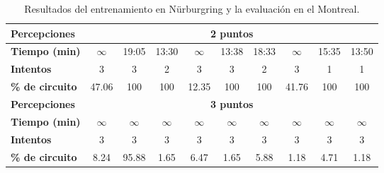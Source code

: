 \begin{table}[ht!]
\begin{tabular}{|l|c|c|c|c|c|c|c|c|c|}
\rowcolor[HTML]{EFEFEF} 
\textbf{Percepciones}                           & \multicolumn{9}{c|}{\cellcolor[HTML]{EFEFEF}\textbf{2 puntos}}                                                                                                                                                        \\ \hline
\rowcolor[HTML]{FFFFFF} 
\cellcolor[HTML]{EFEFEF}\textbf{Tiempo (min)}            & $\infty$                         & 19:05        & 13:30       & $\infty$                       & 13:38                        & 18:33      & $\infty$                       & 15:35                         & 13:50      \\ \hline
\rowcolor[HTML]{FFFFFF} 
\cellcolor[HTML]{EFEFEF}\textbf{Intentos}                & 3                               & 3            & 2           & 3                             & 3                            & 2          & 3                             & 1                             & 1          \\ \hline
\rowcolor[HTML]{32CB00} 
\cellcolor[HTML]{EFEFEF}\textbf{\% de circuito}          & \cellcolor[HTML]{FFC702}47.06   & 100          & 100         & \cellcolor[HTML]{FFC702}12.35 & 100                          & 100        & \cellcolor[HTML]{FFC702}41.76 & 100                           & 100        \\ \hline
\rowcolor[HTML]{EFEFEF} 
\textbf{Percepciones}                                    & \multicolumn{9}{c|}{\cellcolor[HTML]{EFEFEF}\textbf{3 puntos}}                                                                                                                                                        \\ \hline
\cellcolor[HTML]{EFEFEF}\textbf{Tiempo (min)}   & $\infty$                         & $\infty$      & $\infty$     & $\infty$                       & $\infty$                      & $\infty$    & $\infty$                       & $\infty$                       & $\infty$    \\ \hline
\cellcolor[HTML]{EFEFEF}\textbf{Intentos}       & 3                               & 3            & 3           & 3                             & 3                            & 3          & 3                             & 3                             & 3          \\ \hline
\rowcolor[HTML]{FFC702} 
\cellcolor[HTML]{EFEFEF}\textbf{\% de circuito} & 8.24                            & 95.88        & 1.65        & 6.47                          & 1.65                         & 5.88       & 1.18                          & 4.71                          & 1.18       \\ \hline
\end{tabular}
\caption{Resultados del entrenamiento en Nürburgring y la evaluación en el Montreal.}
\label{tab:entrenamiento-nurbur-evaluacion-montreal}
\end{table}


